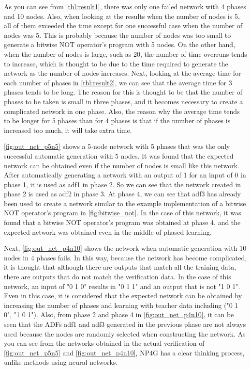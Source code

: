 \documentclass{article}
\begin{document}
As you can see from \ref{tbl:result1}, there was only one failed network with 4 phases and 10 nodes.
Also, when looking at the results when the number of nodes is 5, all of them exceeded the time except for one successful case when the number of nodes was 5.
This is probably because the number of nodes was too small to generate a bitwise NOT operator's program with 5 nodes.
On the other hand, when the number of nodes is large, such as 20, the number of time overruns tends to increase, which is thought to be due to the time required to generate the network as the number of nodes increases.
Next, looking at the average time for each number of phases in \ref{tbl:result2}, we can see that the average time for 3 phases tends to be long.
The reason for this is thought to be that the number of phases to be taken is small in three phases, and it becomes necessary to create a complicated network in one phase.
Also, the reason why the average time tends to be longer for 5 phases than for 4 phases is that if the number of phases is increased too much, it will take extra time.

\ref{fig:out_net_p5n5} shows a 5-node network with 5 phases that was the only successful automatic generation with 5 nodes.
It was found that the expected network can be obtained even if the number of nodes is small like this network.
After automatically generating a network with an output of 1 for an input of 0 in phase 1, it is used as adf1 in phase 2. So we can see that the network created in phase 2 is used as adf2 in phase 3.
At phase 4, we can see that adf3 has already been used to create a network similar to the example implementation of a bitwise NOT operator's program in \ref{fig:bitwise_not}.
In the case of this network, it was found that a bitwise NOT operator's program was obtained at phase 4, and the expected network was obtained even in the middle of phased learning.

Next, \ref{fig:out_net_p4n10} shows the network when automatic generation with 10 nodes in 4 phases fails.
In this way, because the network has become complicated, it is thought that although there are outputs that match all the training data, there are outputs that do not match the verification data.
In the case of this network, an input of "0 1 0" results in "0 1 1" and an output that is not "1 0 1".
Even in this case, it is considered that the expected network can be obtained by increasing the number of phases and learning with teacher data including ("0 1 0", "1 0 1").
Also, from phase 2 and phase 4 in \ref{fig:out_net_p4n10}, it can be seen that the ADFs adf1 and adf3 generated in the previous phase are not always used because the nodes are randomly selected when constructing the network.
As you can see from the networks obtained in the actual verification of \ref{fig:out_net_p5n5} and \ref{fig:out_net_p4n10}, NP4G has a clear thinking process, unlike methods using neural networks.
\end{document}
